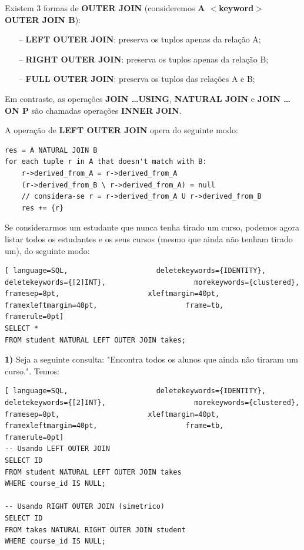 \documentclass[oneside]{book}
\theoremstyle{definition}
\begin{document}
Existem 3 formas de \textbf{OUTER JOIN} (consideremos \textbf{A $<$keyword$>$ OUTER JOIN B}):
\begin{itemize}
    \itemsep0cm
    \item[--]\textbf{LEFT OUTER JOIN}: preserva os tuplos apenas da relação A;
    \item[--]\textbf{RIGHT OUTER JOIN}: preserva os tuplos apenas da relação B;
    \item[--]\textbf{FULL OUTER JOIN}: preserva os tuplos das relações A e B;
\end{itemize}

Em contraste, as operações \textbf{JOIN \dots USING}, \textbf{NATURAL JOIN} e \textbf{JOIN \dots ON P} são chamadas operações \textbf{INNER JOIN}.

A operação de \textbf{LEFT OUTER JOIN} opera do seguinte modo:
\begin{verbatim}
res = A NATURAL JOIN B
for each tuple r in A that doesn't match with B:
    r->derived_from_A = r->derived_from_A
    (r->derived_from_B \ r->derived_from_A) = null
    // considera-se r = r->derived_from_A U r->derived_from_B
    res += {r}
\end{verbatim}

Se considerarmos um estudante que nunca tenha tirado um curso, podemos agora listar todos os estudantes e os seus cursos (mesmo que ainda não tenham tirado um), do seguinte modo:
\begin{lstlisting}[ language=SQL,                     deletekeywords={IDENTITY},                     deletekeywords={[2]INT},                     morekeywords={clustered},                     framesep=8pt,                     xleftmargin=40pt,                     framexleftmargin=40pt,                     frame=tb,                     framerule=0pt]
SELECT *
FROM student NATURAL LEFT OUTER JOIN takes;
\end{lstlisting}

\textbf{1)} Seja a seguinte consulta: "Encontra todos os alunos que ainda não tiraram um curso.". Temos:
\begin{lstlisting}[ language=SQL,                     deletekeywords={IDENTITY},                     deletekeywords={[2]INT},                     morekeywords={clustered},                     framesep=8pt,                     xleftmargin=40pt,                     framexleftmargin=40pt,                     frame=tb,                     framerule=0pt]
-- Usando LEFT OUTER JOIN
SELECT ID
FROM student NATURAL LEFT OUTER JOIN takes
WHERE course_id IS NULL;

-- Usando RIGHT OUTER JOIN (simetrico)
SELECT ID
FROM takes NATURAL RIGHT OUTER JOIN student
WHERE course_id IS NULL;
\end{lstlisting}
\end{document}
